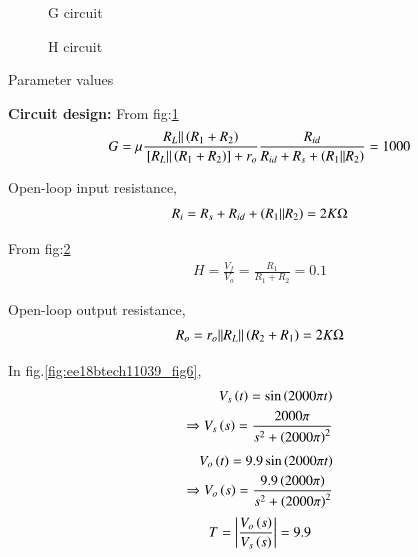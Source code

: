 \begin{enumerate}[label=\thesubsection.\arabic*.,ref=\thesubsection.\theenumi]
\begin{figure}[!h]
		\resizebox{\columnwidth}{!}{}
\caption{G circuit}
\label{fig:ee18btech11039_fig4}
\end{figure}

\begin{figure}[!h]
		\resizebox{\columnwidth}{!}{}
\caption{H circuit}
\label{fig:ee18btech11039_fig5}
\end{figure}

\begin{table}[!h]
\centering

\caption{Parameter values}
\label{table:ee18btech11039_tab2}
\end{table}

\textbf{Circuit design: }
From fig:\ref{fig:ee18btech11039_fig4}
\begin{align}
G = \mu \frac{R_L || \left(R_1 + R_2\right)}{{}\left[R_L || \left(R_1 + R_2\right)\right]+r_o} \frac{R_{id}}{R_{id}+R_s+\left(R_1||R_2\right)} = 1000
\end{align}

Open-loop input resistance,
\begin{align}
     R_i =  R_s + R_{id} + \left(R_1 || R_2\right) = 2K\ohm
\end{align}

From fig:\ref{fig:ee18btech11039_fig5}
\begin{align}
H = \frac{V_f}{V_o} = \frac{R_1}{R_1 + R_2} = 0.1
\end{align}

Open-loop output resistance,
\begin{align}
      R_o = r_o || R_L || \left(R_2 + R_1\right) = 2K\ohm
\end{align}

In fig.\ref{fig:ee18btech11039_fig6}, 
\begin{align}
    V_{s}\left(t\right) = \sin\left(2000\pi t\right) \\
    \Rightarrow V_{s}\left(s\right) = \frac{2000\pi}{s^2 + \left(2000\pi\right)^2}
\end{align}
\begin{align}
    V_{o}\left(t\right) = 9.9\sin\left(2000\pi t\right)\\
    \Rightarrow V_{o}\left(s\right) = \frac{9.9\left(2000\pi\right)}{s^2 + \left(2000\pi\right)^2}
\end{align}
\begin{align}
    T = \left|\frac{V_o\left(s\right)}{V_{s}\left(s\right)}\right| = 9.9
\end{align}


\end{enumerate}
